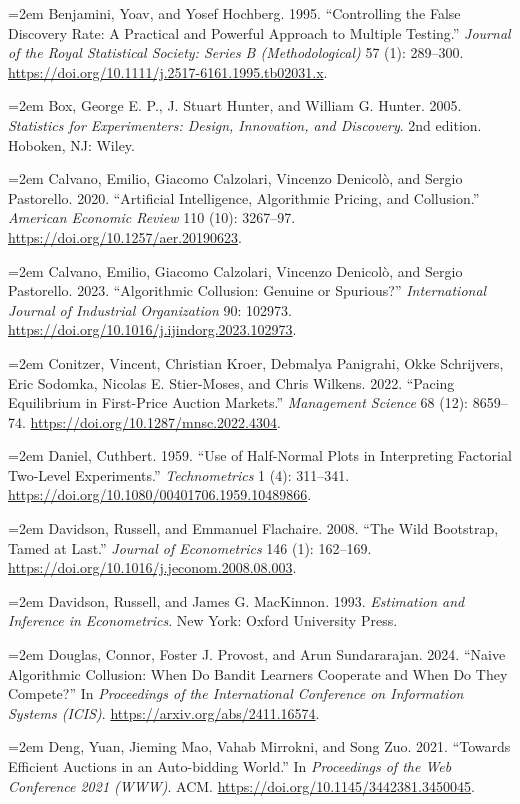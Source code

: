 \hangindent=2em Benjamini, Yoav, and Yosef Hochberg. 1995. ``Controlling the False Discovery Rate: A Practical and Powerful Approach to Multiple Testing.'' \textit{Journal of the Royal Statistical Society: Series B (Methodological)} 57 (1): 289--300. \url{https://doi.org/10.1111/j.2517-6161.1995.tb02031.x}.

\hangindent=2em Box, George E. P., J. Stuart Hunter, and William G. Hunter. 2005. \textit{Statistics for Experimenters: Design, Innovation, and Discovery}. 2nd edition. Hoboken, NJ: Wiley.

\hangindent=2em Calvano, Emilio, Giacomo Calzolari, Vincenzo Denicol\`{o}, and Sergio Pastorello. 2020. ``Artificial Intelligence, Algorithmic Pricing, and Collusion.'' \textit{American Economic Review} 110 (10): 3267--97. \url{https://doi.org/10.1257/aer.20190623}.

\hangindent=2em Calvano, Emilio, Giacomo Calzolari, Vincenzo Denicol\`{o}, and Sergio Pastorello. 2023. ``Algorithmic Collusion: Genuine or Spurious?'' \textit{International Journal of Industrial Organization} 90: 102973. \url{https://doi.org/10.1016/j.ijindorg.2023.102973}.

\hangindent=2em Conitzer, Vincent, Christian Kroer, Debmalya Panigrahi, Okke Schrijvers, Eric Sodomka, Nicolas E. Stier-Moses, and Chris Wilkens. 2022. ``Pacing Equilibrium in First-Price Auction Markets.'' \textit{Management Science} 68 (12): 8659--74. \url{https://doi.org/10.1287/mnsc.2022.4304}.

\hangindent=2em Daniel, Cuthbert. 1959. ``Use of Half-Normal Plots in Interpreting Factorial Two-Level Experiments.'' \textit{Technometrics} 1 (4): 311--341. \url{https://doi.org/10.1080/00401706.1959.10489866}.

\hangindent=2em Davidson, Russell, and Emmanuel Flachaire. 2008. ``The Wild Bootstrap, Tamed at Last.'' \textit{Journal of Econometrics} 146 (1): 162--169. \url{https://doi.org/10.1016/j.jeconom.2008.08.003}.

\hangindent=2em Davidson, Russell, and James G. MacKinnon. 1993. \textit{Estimation and Inference in Econometrics}. New York: Oxford University Press.

\hangindent=2em Douglas, Connor, Foster J. Provost, and Arun Sundararajan. 2024. ``Naive Algorithmic Collusion: When Do Bandit Learners Cooperate and When Do They Compete?'' In \textit{Proceedings of the International Conference on Information Systems (ICIS)}. \url{https://arxiv.org/abs/2411.16574}.

\hangindent=2em Deng, Yuan, Jieming Mao, Vahab Mirrokni, and Song Zuo. 2021. ``Towards Efficient Auctions in an Auto-bidding World.'' In \textit{Proceedings of the Web Conference 2021 (WWW)}. ACM. \url{https://doi.org/10.1145/3442381.3450045}.

